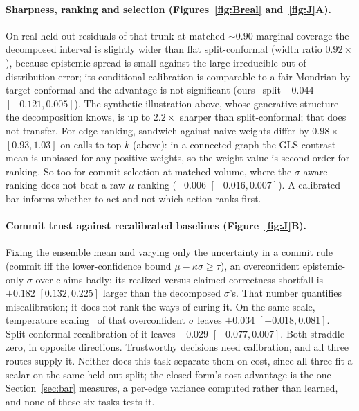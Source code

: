 \paragraph{Sharpness, ranking and selection (Figures~\ref{fig:Breal} and~\ref{fig:J}A).} On real
held-out residuals of that trunk at matched $\sim$$0.90$ marginal coverage the decomposed interval
is slightly wider than flat split-conformal (width ratio $0.92\times$), because epistemic spread is
small against the large irreducible out-of-distribution error; its conditional calibration is
comparable to a fair Mondrian-by-target conformal and the advantage is not significant
(ours$-$split $-0.044$ $[-0.121,0.005]$). The synthetic illustration above, whose generative
structure the decomposition knows, is up to $2.2\times$ sharper than split-conformal; that does not
transfer. For edge ranking, sandwich against naive weights differ by $0.98\times$ $[0.93,1.03]$ on
calls-to-top-$k$ (above): in a connected graph the GLS contrast mean is unbiased for any positive
weights, so the weight value is second-order for ranking. So too for commit selection at matched volume,
where the $\sigma$-aware ranking does not beat a raw-$\mu$ ranking ($-0.006$ $[-0.016,0.007]$). A
calibrated bar informs whether to act and not which action ranks first.

\paragraph{Commit trust against recalibrated baselines (Figure~\ref{fig:J}B).} Fixing the ensemble
mean and varying only the uncertainty in a commit rule (commit iff the lower-confidence bound
$\mu-\kappa\sigma\ge\tau$), an overconfident epistemic-only $\sigma$ over-claims badly: its
realized-versus-claimed correctness shortfall is $+0.182$ $[0.132,0.225]$ larger than the
decomposed $\sigma$'s. That number quantifies miscalibration; it does not rank the ways of curing
it. On the same scale, temperature scaling~\citep{guo2017calibration} of that overconfident $\sigma$
leaves $+0.034$ $[-0.018,0.081]$. Split-conformal recalibration of it leaves $-0.029$
$[-0.077,0.007]$. Both straddle zero, in opposite directions. Trustworthy decisions need calibration, and all three
routes supply it. Neither does this task separate them on
cost, since all three fit a scalar on the same held-out split; the closed form's cost advantage is
the one Section~\ref{sec:bar} measures, a per-edge variance computed rather than learned, and none
of these six tasks tests it.


